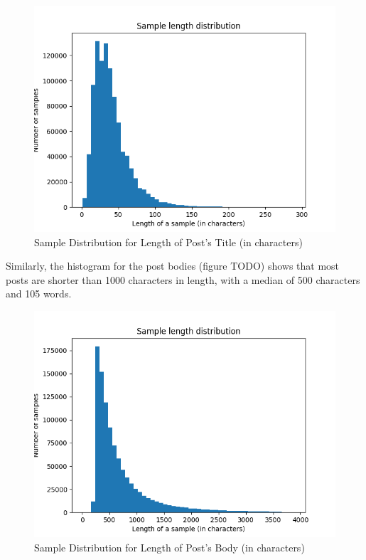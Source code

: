 \documentclass{sig-alternate-05-2015}
\begin{document}
\begin{figure}[H]
\centering
\includegraphics[width=\linewidth]{plots/sample-length-distribution-title-1000000.png}
\caption{Sample Distribution for Length of Post's Title (in characters)}
\end{figure}

Similarly, the histogram for the post bodies (figure TODO) shows that most posts are shorter than 1000 characters in length, with a median of 500 characters and 105 words.

\begin{figure}[H]
\centering
\includegraphics[width=\linewidth]{plots/sample-length-distribution-selftext-1000000.png}
\caption{Sample Distribution for Length of Post's Body (in characters)}
\end{figure}
\end{document}
